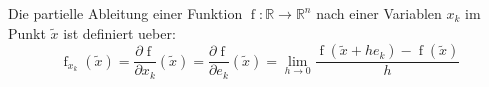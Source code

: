 Die partielle Ableitung einer Funktion $\operatorname{f} : \mathbb{R} \to \mathbb{R}^n$ nach einer Variablen $x_k$ im Punkt $\tilde{x}$ ist definiert ueber:
$$\operatorname{f}_{x_k}(\tilde{x}) = \frac{\partial \operatorname{f}}{\partial x_k}(\tilde{x}) = \frac{\partial \operatorname{f}}{\partial e_k}(\tilde{x}) = \lim\limits_{h \to 0}\frac{\operatorname{f}(\tilde{x} + h e_k) - \operatorname{f}(\tilde{x})}{h}$$ 
